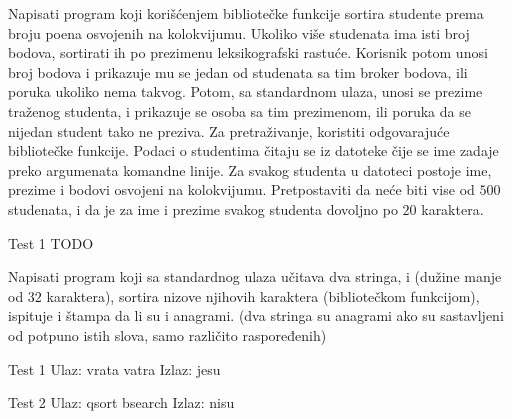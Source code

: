 \begin{Exercise}[label=520]
  Napisati program koji korišćenjem bibliotečke funkcije 
  sortira studente prema broju poena osvojenih na kolokvijumu. Ukoliko više
  studenata ima isti broj bodova, sortirati ih po prezimenu
  leksikografski rastuće. Korisnik potom unosi broj bodova i prikazuje
  mu se jedan od studenata sa tim broker bodova, ili poruka ukoliko
  nema takvog. Potom, sa standardnom ulaza, unosi se prezime traženog
  studenta, i prikazuje se osoba sa tim prezimenom, ili poruka da se
  nijedan student tako ne preziva. Za pretraživanje, koristiti
  odgovarajuće bibliotečke funkcije. Podaci o studentima čitaju se iz
  datoteke čije se ime zadaje preko argumenata komandne linije. Za
  svakog studenta u datoteci postoje ime, prezime i bodovi osvojeni na
  kolokvijumu. Pretpostaviti da neće biti vise od $500$ studenata, i da
  je za ime i prezime svakog studenta dovoljno po $20$ karaktera.
  
\begin{miditest}
\begin{test}{Test 1}
TODO
\end{test}
\end{miditest}
  
\end{Exercise}

\begin{Exercise}[label=521]
  Napisati program koji sa standardnog ulaza učitava dva stringa,
   i  (dužine manje od $32$ karaktera), sortira nizove
  njihovih karaktera (bibliotečkom  funkcijom), ispituje
  i štampa da li su  i  anagrami. (dva stringa su
  anagrami ako su sastavljeni od potpuno istih slova, samo različito
  raspoređenih)
  
\begin{minitest}
\begin{test}{Test 1}
Ulaz:   vrata vatra
Izlaz:  jesu
\end{test}
\end{minitest}
\begin{miditest}
\begin{test}{Test 2}
Ulaz:   qsort bsearch
Izlaz:  nisu
\end{test}
\end{miditest}
  
\end{Exercise}

